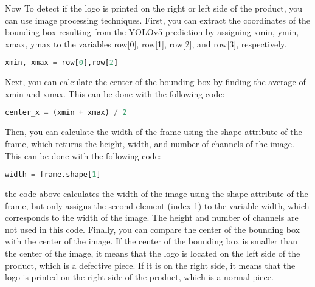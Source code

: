 \begin{itemize}
Now To detect if the logo is printed on the right or left side of the product, you can use image processing techniques. First, you can extract the coordinates of the bounding box resulting from the YOLOv5 prediction by assigning xmin, ymin, xmax, ymax to the variables row[0], row[1], row[2], and row[3], respectively.
\begin{lstlisting}[language=Python]
xmin, xmax = row[0],row[2]
\end{lstlisting}
Next, you can calculate the center of the bounding box by finding the average of xmin and xmax. This can be done with the following code:
\begin{lstlisting}[language=Python]
center_x = (xmin + xmax) / 2
\end{lstlisting}
Then, you can calculate the width of the frame using the shape attribute of the frame, which returns the height, width, and number of channels of the image. This can be done with the following code:
\begin{lstlisting}[language=Python]
width = frame.shape[1]
\end{lstlisting}
the code above  calculates the width of the image using the shape attribute of the frame, but only assigns the second element (index 1) to the variable width, which corresponds to the width of the image. The height and number of channels are not used in this code.
Finally, you can compare the center of the bounding box with the center of the image. If the center of the bounding box is smaller than the center of the image, it means that the logo is located on the left side of the product, which is a defective piece. If it is on the right side, it means that the logo is printed on the right side of the product, which is a normal piece.
\end{itemize}













%




%